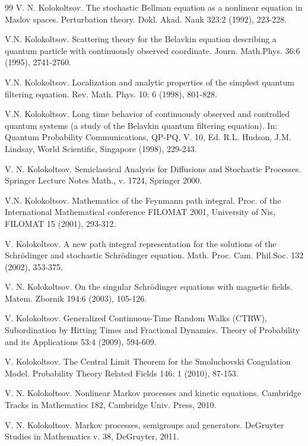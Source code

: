 \documentclass[12pt]{article}
\begin{document}
\begin{thebibliography}{99}
 V. N. Kolokoltsov.
 The stochastic Bellman equation as a nonlinear equation
in Maslov spaces. Perturbation theory.  Dokl. Akad. Nauk
323:2 (1992), 223-228.


 V.N. Kolokoltsov.
Scattering theory for the Belavkin equation describing
a quantum particle with continuously observed coordinate.
 Journ. Math.Phys. 36:6 (1995), 2741-2760.

 V.N. Kolokoltsov.
Localization and analytic properties of the simplest quantum
filtering equation. Rev. Math. Phys. 10: 6 (1998), 801-828.

V.N. Kolokoltsov.
Long time behavior of continuously observed and controlled
quantum systems (a study of the Belavkin quantum filtering
equation).  In: Quantum  Probability Communications, QP-PQ, V.
10, Ed. R.L. Hudson, J.M. Lindsay, World Scientific, Singapore
(1998), 229-243.

V. N. Kolokoltsov. Semiclassical Analysis for
Diffusions and Stochastic Processes.
Springer Lecture Notes
Math., v. 1724, Springer 2000.

 V.N. Kolokoltsov. Mathematics of the Feynmann
path integral. Proc. of the International Mathematical conference
FILOMAT 2001, University of Nis, FILOMAT 15 (2001), 293-312.

V. Kolokoltsov. A new path
integral representation for the solutions of the Schr\"odinger and
stochastic Schr\"odinger equation. Math. Proc. Cam. Phil.Soc.
132 (2002), 353-375.

V. N. Kolokoltsov. On the
singular Schr\"odinger equations with magnetic fields. Matem.
Zbornik 194:6 (2003), 105-126.

V. Kolokoltsov. Generalized Continuous-Time Random Walks (CTRW),
 Subordination by Hitting Times and Fractional Dynamics.
 Theory of Probability and its Applications 53:4 (2009), 594-609.

 V. Kolokoltsov. The Central Limit Theorem for the
Smoluchovski Coagulation Model.
Probability Theory Related Fields 146: 1 (2010), 87-153.

 V. N. Kolokoltsov. Nonlinear Markov processes and kinetic
equations. Cambridge Tracks in Mathematics 182, Cambridge Univ. Press, 2010.

V. N. Kolokoltsov.  Markov processes, semigroups and generators.
DeGruyter Studies in Mathematics v. 38, DeGruyter, 2011.


\end{thebibliography}
\end{document}
